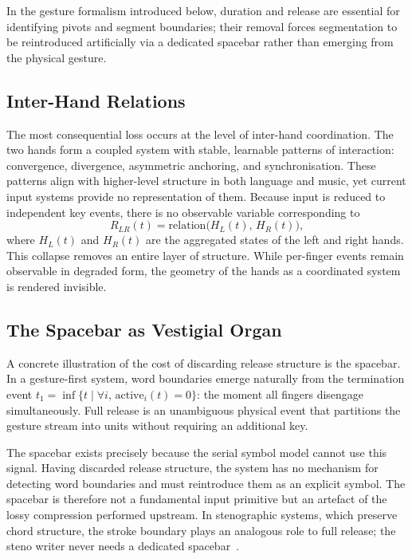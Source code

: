 \documentclass[11pt, a4paper]{article}
\begin{document}
In the gesture formalism introduced below, duration and release are
essential for identifying pivots and segment boundaries; their removal
forces segmentation to be reintroduced artificially via a dedicated
spacebar rather than emerging from the physical gesture.

\subsection{Inter-Hand Relations}

The most consequential loss occurs at the level of inter-hand
coordination. The two hands form a coupled system with stable, learnable
patterns of interaction: convergence, divergence, asymmetric anchoring,
and synchronisation. These patterns align with higher-level structure in
both language and music, yet current input systems provide no
representation of them. Because input is reduced to independent key
events, there is no observable variable corresponding to
\[
  R_{LR}(t) = \mathrm{relation}\bigl(H_L(t),\, H_R(t)\bigr),
\]
where $H_L(t)$ and $H_R(t)$ are the aggregated states of the left and
right hands. This collapse removes an entire layer of structure. While
per-finger events remain observable in degraded form, the geometry of
the hands as a coordinated system is rendered invisible.

\subsection{The Spacebar as Vestigial Organ}

A concrete illustration of the cost of discarding release structure is
the spacebar. In a gesture-first system, word boundaries emerge naturally
from the termination event $t_1 = \inf\{t \mid \forall i,\,
\mathrm{active}_i(t) = 0\}$: the moment all fingers disengage
simultaneously. Full release is an unambiguous physical event that
partitions the gesture stream into units without requiring an additional
key.

The spacebar exists precisely because the serial symbol model cannot use
this signal. Having discarded release structure, the system has no
mechanism for detecting word boundaries and must reintroduce them as an
explicit symbol. The spacebar is therefore not a fundamental input
primitive but an artefact of the lossy compression performed upstream.
In stenographic systems, which preserve chord structure, the stroke
boundary plays an analogous role to full release; the steno writer never
needs a dedicated spacebar~\cite{plover}.
\end{document}

